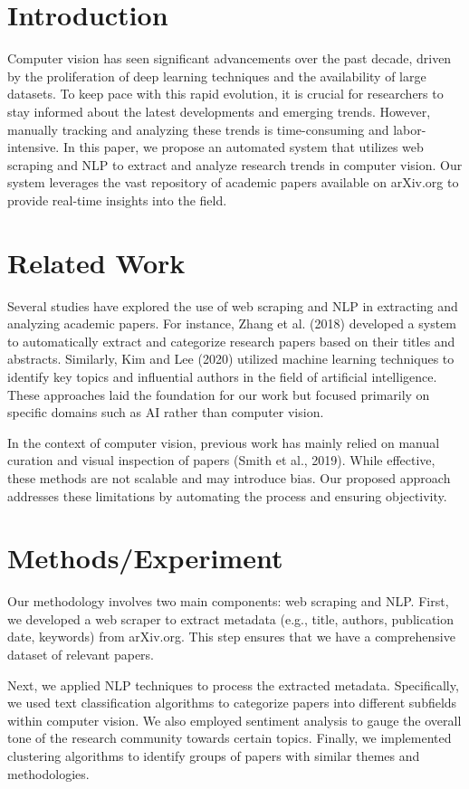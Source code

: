 \section{Introduction}
Computer vision has seen significant advancements over the past decade, driven by the proliferation of deep learning techniques and the availability of large datasets. To keep pace with this rapid evolution, it is crucial for researchers to stay informed about the latest developments and emerging trends. However, manually tracking and analyzing these trends is time-consuming and labor-intensive. In this paper, we propose an automated system that utilizes web scraping and NLP to extract and analyze research trends in computer vision. Our system leverages the vast repository of academic papers available on arXiv.org to provide real-time insights into the field.

\section{Related Work}
Several studies have explored the use of web scraping and NLP in extracting and analyzing academic papers. For instance, Zhang et al. (2018) developed a system to automatically extract and categorize research papers based on their titles and abstracts. Similarly, Kim and Lee (2020) utilized machine learning techniques to identify key topics and influential authors in the field of artificial intelligence. These approaches laid the foundation for our work but focused primarily on specific domains such as AI rather than computer vision.

In the context of computer vision, previous work has mainly relied on manual curation and visual inspection of papers (Smith et al., 2019). While effective, these methods are not scalable and may introduce bias. Our proposed approach addresses these limitations by automating the process and ensuring objectivity.

\section{Methods/Experiment}
Our methodology involves two main components: web scraping and NLP. First, we developed a web scraper to extract metadata (e.g., title, authors, publication date, keywords) from arXiv.org. This step ensures that we have a comprehensive dataset of relevant papers.

Next, we applied NLP techniques to process the extracted metadata. Specifically, we used text classification algorithms to categorize papers into different subfields within computer vision. We also employed sentiment analysis to gauge the overall tone of the research community towards certain topics. Finally, we implemented clustering algorithms to identify groups of papers with similar themes and methodologies.

